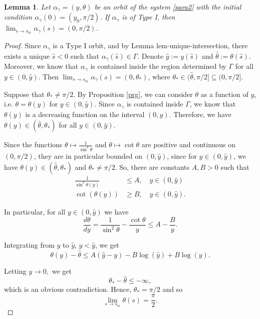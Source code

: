 \documentclass[10pt,a4paper]{amsart}
\newtheorem{lemma}{Lemma}
\begin{document}
\begin{lemma}\label{le56}
    Let $\alpha_\gamma = (y, \theta)$ be an orbit of the system \eqref{para2} with the initial condition $\alpha_\gamma(0) = (y_0, \pi/2)$. If $\alpha_\gamma$ is of Type I, then $\lim_{s \to s_m} \alpha_\gamma(s) = (0, \pi/2)$.
\end{lemma}

\begin{proof}
    Since $\alpha_\gamma$ is a Type I orbit, and by Lemma {lem-unique-intersection}, there exists a unique $\hat{s} < 0$ such that $\alpha_\gamma(\hat{s}) \in \Gamma$. Denote $\hat{y} := y(\hat{s})$ and $\hat{\theta} := \theta(\hat{s})$. Moreover, we know that  $\alpha_\gamma$ is contained inside the region determined by $\Gamma$ for all $y \in (0, \hat{y})$. Then $\lim_{s \to s_m} \alpha_\gamma(s) = (0, \theta_\ast)$, where $\theta_\ast \in (\hat{\theta}, \pi / 2] \subseteq (0, \pi/2]$.

    Suppose that $\theta_\ast \neq \pi / 2$. By Proposition \ref{prg}, we  can consider $\theta$ as a function of $y$, i.e. $\theta = \theta(y)$ for $y \in (0, \hat{y})$. Since $\alpha_\gamma$ is contained inside $\Gamma$, we know that $\theta(y)$ is a decreasing function on the interval $(0, \hat{y})$. Therefore, we have $\theta(y) \in (\hat{\theta}, \theta_\ast)$ for all $y \in (0,\hat{y})$.

    Since the functions $\theta \mapsto \frac{1}{\sin^2 \theta}$ and $\theta \mapsto \cot\theta$ are positive and continuous on $(0, \pi/2)$, they are in particular bounded on $(0,\hat{y})$, since for $y \in (0, \hat{y})$, we have $\theta(y) \in (\hat{\theta}, \theta_\ast)$ and $\theta_\ast \neq \pi / 2$. So, there are constants $A,B > 0$ such that
    \begin{equation*}
       	\begin{split}
	    \frac{1}{\sin^2 \theta(y)} &\leq A, \quad  y \in (0, \hat{y}) \\
	    \cot(\theta(y)) &\geq B, \quad  y \in (0, \hat{y}).
       	\end{split}
    \end{equation*}

    In particular, for all $y \in (0, \hat{y})$ we have
    $$\frac{d\theta}{dy} = \frac{1}{\sin^2\theta} - \frac{\cot\theta}{y} \leq A - \frac{B}{y}.$$

    Integrating from $y$ to $\hat{y}$, $y < \hat{y}$, we get
    $$\theta(y) - \hat{\theta} \leq A(\hat{y} - y) -B\log(\hat{y}) + B\log(y).$$

    Letting $y \to 0,$ we get $$\theta_\ast - \hat{\theta} \leq - \infty,$$ which is an obvious contradiction. Hence, $\theta_\ast = \pi/2$ and so $$\lim_{s \to s_m} \theta(s) =\frac{ \pi}{2}.$$
\end{proof}
\end{document}
